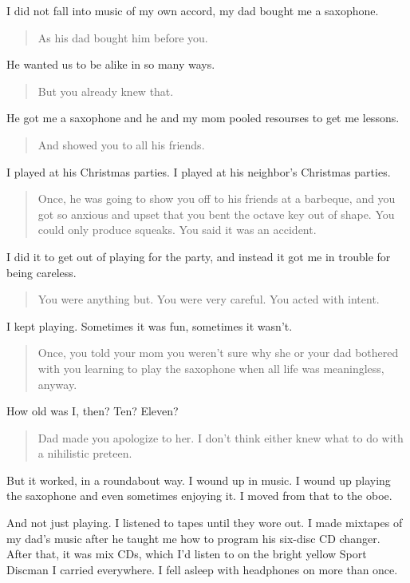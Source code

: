 I did not fall into music of my own accord, my dad bought me a saxophone.

\begin{quote}
As his dad bought him before you.
\end{quote}

He wanted us to be alike in so many ways.

\begin{quote}
But you already knew that.
\end{quote}

He got me a saxophone and he and my mom pooled resourses to get me lessons.

\begin{quote}
And showed you to all his friends.
\end{quote}

I played at his Christmas parties. I played at his neighbor's Christmas parties.

\begin{quote}
Once, he was going to show you off to his friends at a barbeque, and you got so anxious and upset that you bent the octave key out of shape. You could only produce squeaks. You said it was an accident.
\end{quote}

I did it to get out of playing for the party, and instead it got me in trouble for being careless.

\begin{quote}
You were anything but. You were very careful. You acted with intent.
\end{quote}

I kept playing. Sometimes it was fun, sometimes it wasn't.

\begin{quote}
Once, you told your mom you weren't sure why she or your dad bothered with you learning to play the saxophone when all life was meaningless, anyway.
\end{quote}

How old was I, then? Ten? Eleven?

\begin{quote}
Dad made you apologize to her. I don't think either knew what to do with a nihilistic preteen.
\end{quote}

But it worked, in a roundabout way. I wound up in music. I wound up playing the saxophone and even sometimes enjoying it. I moved from that to the oboe.

And not just playing. I listened to tapes until they wore out. I made mixtapes of my dad's music after he taught me how to program his six-disc CD changer. After that, it was mix CDs, which I'd listen to on the bright yellow Sport Discman I carried everywhere. I fell asleep with headphones on more than once.

